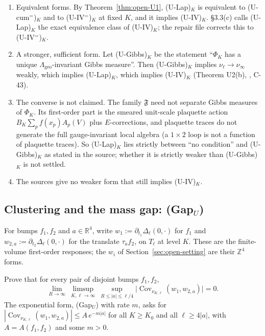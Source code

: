 \begin{remark}\label{rem:open-ulap-forms}
\begin{enumerate}
\item Equivalent forms. By Theorem~\ref{thm:open-U1}, (U-Lap)$_K$ is equivalent to (U-cum$^=$)$_K$ and to (U-IV$^=$)$_K$ at fixed $K$, and it implies (U-IV)$_K$.  \S3.3(c) calls (U-Lap)$_K$ the exact equivalence class of (U-IV)$_K$; the repair file corrects this to (U-IV$^=$)$_K$.
\item A stronger, sufficient form. Let (U-Gibbs)$_K$ be the statement ``$\Phi_K$ has a unique $\Lambda_{\mathrm{geo}}$-invariant Gibbs measure''. Then (U-Gibbs)$_K$ implies $\nu_\ell\to\nu_\infty$ weakly, which implies (U-Lap)$_K$, which implies (U-IV)$_K$ (Theorem U2(b), ,  C-43).
\item The converse is not claimed. The family $\mathfrak F$ need not separate Gibbs measures of $\Phi_K$. Its first-order part is the smeared unit-scale plaquette action $B_K\sum_pf(x_p)A_p(V)$ plus $E$-corrections, and plaquette traces do not generate the full gauge-invariant local algebra (a $1\times2$ loop is not a function of plaquette traces). So (U-Lap)$_K$ lies strictly between ``no condition'' and (U-Gibbs)$_K$ as stated in the source; whether it is strictly weaker than (U-Gibbs)$_K$ is not settled.
\item The sources give no weaker form that still implies (U-IV)$_K$.
\end{enumerate}
\end{remark}

\subsection{Clustering and the mass gap: (Gap$_U$)}\label{sec:open-gap}

For bumps $f_1,f_2$ and $a\in\mathbb R^4$, write $w_1:=\partial_{t_1}\Delta_\ell(0,\cdot)$ for $f_1$ and $w_{2,a}:=\partial_{t_2}\Delta_\ell(0,\cdot)$ for the translate $\tau_af_2$, on $T_\ell$ at level $K$. These are the finite-volume first-order responses; the $w_i$ of Section~\ref{sec:open-setting} are their $\mathbb Z^4$ forms.

\begin{problem}\label{prob:Gap}
Prove that for every pair of disjoint bumps $f_1,f_2$,
\[
\lim_{R\to\infty}\ \limsup_{K,\ell\to\infty}\ \sup_{R\le|a|\le\ell/4}\bigl|\operatorname{Cov}_{\nu_{K,\ell}}(w_1,w_{2,a})\bigr|=0 .
\]
The exponential form, (Gap$_U$) with rate $m$, asks for $|\operatorname{Cov}_{\nu_{K,\ell}}(w_1,w_{2,a})|\le A\,e^{-m|a|}$ for all $K\ge K_0$ and all $\ell\ge4|a|$, with $A=A(f_1,f_2)$ and some $m>0$.
\end{problem}


